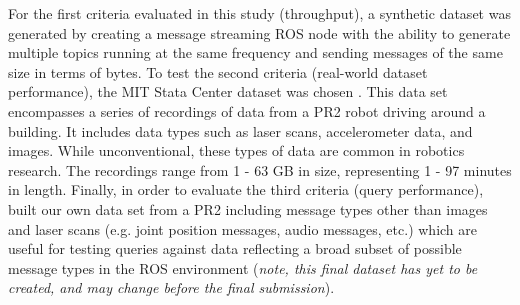 \documentclass[nocopyrightspace]{acm_proc_article-sp}
\begin{document}
For the first criteria evaluated in this study (throughput), a synthetic dataset was generated by creating a message streaming ROS node with the ability to generate multiple topics running at the same frequency and sending messages of the same size in terms of bytes. To test the second criteria (real-world dataset performance), the MIT Stata Center dataset was chosen \cite{fallon2013stata}. This data set encompasses a series of recordings of data from a PR2 robot driving around a building. It includes data types such as laser scans, accelerometer data, and images. While unconventional, these types of data are common in robotics research. The recordings range from 1 - 63 GB in size, representing 1 - 97 minutes in length. Finally, in order to evaluate the third criteria (query performance), built our own data set from a PR2 including message types other than images and laser scans (e.g. joint position messages, audio messages, etc.) which are useful for testing queries against data reflecting a broad subset of possible message types in the ROS environment (\textit{note, this final dataset has yet to be created, and may change before the final submission}).
\end{document}
